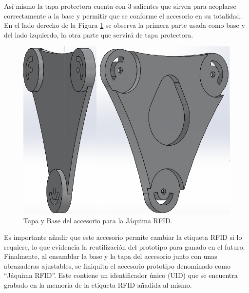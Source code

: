 Así mismo la tapa protectora cuenta con 3 salientes que sirven para acoplarse correctamente a la base y permitir que se conforme el accesorio en su totalidad. En  el lado derecho de la Figura \ref{tapabasepng} se observa la primera parte usada como base y del lado izquierdo, la otra parte que servirá de tapa protectora.

        \begin{figure}[H]
		\begin{center}
			\includegraphics[scale=0.55]{img/tapabase.png}
		\end{center}
		\caption{Tapa y Base del accesorio para la Jáquima RFID. \label{tapabasepng}}
		\end{figure}

Es importante añadir que este accesorio permite cambiar la etiqueta RFID si lo requiere, lo que evidencia la reutilización del prototipo para ganado en el futuro.\\

Finalmente, al ensamblar la base y la tapa del accesorio junto con unas abrazaderas ajustables, se finiquita el accesorio prototipo denominado como ``Jáquima RFID''. Este contiene un identificador único (UID) que se encuentra grabado en la memoria de la etiqueta RFID añadida al mismo.

